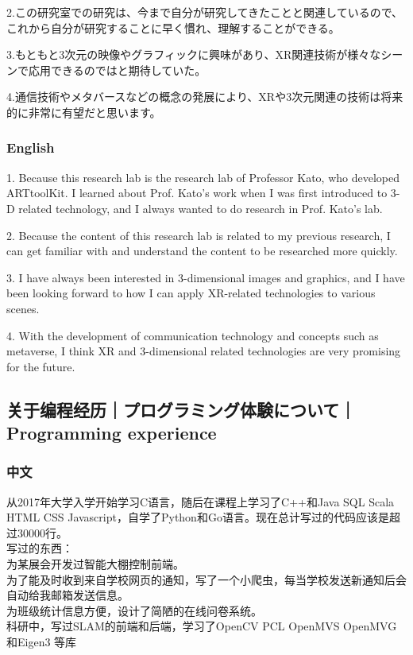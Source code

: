 \documentclass[lang=cn,11pt,a4paper]{elegantpaper}
\begin{document}
2.この研究室での研究は、今まで自分が研究してきたことと関連しているので、これから自分が研究することに早く慣れ、理解することができる。

3.もともと3次元の映像やグラフィックに興味があり、XR関連技術が様々なシーンで応用できるのではと期待していた。

4.通信技術やメタバースなどの概念の発展により、XRや3次元関連の技術は将来的に非常に有望だと思います。
\subsubsection{English}
1. Because this research lab is the research lab of Professor Kato, who developed ARTtoolKit. I learned about Prof. Kato's work when I was first introduced to 3-D related technology, and I always wanted to do research in Prof. Kato's lab.

2. Because the content of this research lab is related to my previous research, I can get familiar with and understand the content to be researched more quickly.

3. I have always been interested in 3-dimensional images and graphics, and I have been looking forward to how I can apply XR-related technologies to various scenes.

4. With the development of communication technology and concepts such as metaverse, I think XR and 3-dimensional related technologies are very promising for the future.

\subsection{关于编程经历｜プログラミング体験について｜Programming experience}
\subsubsection{中文}
从2017年大学入学开始学习C语言，随后在课程上学习了C++和Java SQL Scala HTML CSS Javascript，自学了Python和Go语言。现在总计写过的代码应该是超过30000行。\\
写过的东西：\\
为某展会开发过智能大棚控制前端。\\
为了能及时收到来自学校网页的通知，写了一个小爬虫，每当学校发送新通知后会自动给我邮箱发送信息。\\
为班级统计信息方便，设计了简陋的在线问卷系统。\\
科研中，写过SLAM的前端和后端，学习了OpenCV PCL OpenMVS OpenMVG和Eigen3 等库\\
\end{document}
